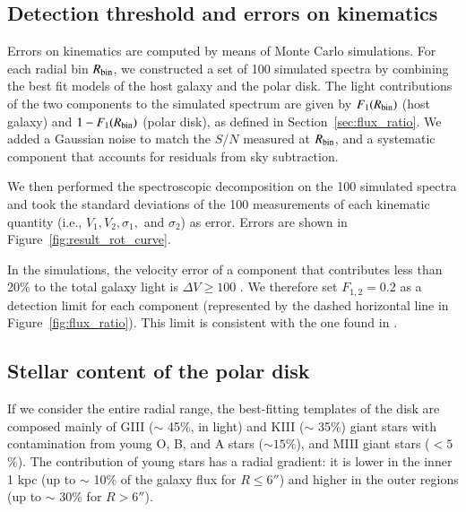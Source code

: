 \documentclass{aa}
\begin{document}
\subsection{Detection threshold and errors on kinematics}
\label{sec:errors}

Errors on kinematics are computed by means of Monte Carlo
simulations. For each radial bin $R_{\rm bin}$, we constructed a set
of 100 simulated spectra by combining the best fit models of the host
galaxy and the polar disk. The light contributions of the two components
to the simulated spectrum are given by $F_1(R_{\rm bin})$ (host
galaxy) and $1-F_1(R_{\rm bin})$ (polar disk), as defined in
Section~\ref{sec:flux_ratio}. We added a Gaussian noise to match the
$S/N$ measured at $R_{\rm bin}$, and a systematic component that
accounts for residuals from sky subtraction.

We then performed the spectroscopic decomposition on the 100 simulated
spectra and took the standard deviations of the 100 measurements of
each kinematic quantity (i.e., $V_1, V_2, \sigma_1,$ and $\sigma_2$) as
error. Errors are shown in Figure~\ref{fig:result_rot_curve}.

In the simulations, the velocity error of a component that contributes
less than 20\% to the total galaxy light is $\Delta V \geq 100$
\kms. We therefore set $F_{1,2} = 0.2$ as a detection limit for each
component (represented by the dashed horizontal line in
Figure~\ref{fig:flux_ratio}). This limit is consistent with the one
found in \citet{Coccato+13}.

\subsection{Stellar content of the polar disk}

If we consider the entire radial range, the best-fitting templates of
the disk are composed mainly of GIII ($\sim$ 45\%, in light) and KIII
($\sim$ 35\%) giant stars with contamination from young O, B, and A
stars ($\sim15$\%), and MIII giant stars ($<5$\%). The contribution of
young stars has a radial gradient: it is lower in the inner 1 kpc (up
to $\sim$ 10\% of the galaxy flux for $R\leq6''$) and higher in the
outer regions (up to $\sim$ 30\% for $R>6''$).
\end{document}
